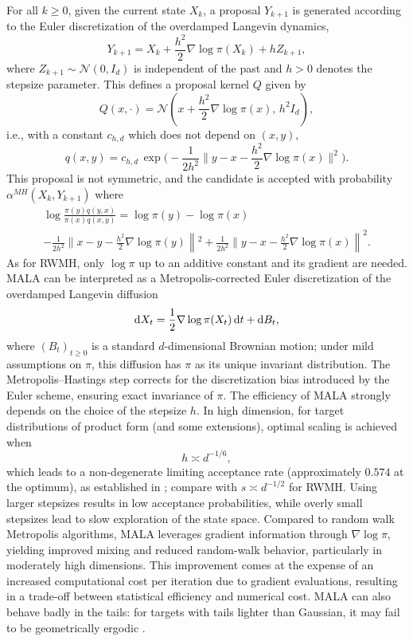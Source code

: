 \documentclass[english,graybox,envcountchap,envcountsame,sectrefs,shortlabels]{svmono}
\theoremstyle{style}
\newcommand{\eqsp}{}
\begin{document}
For all $k\geq 0$, given the current state $X_k$, a proposal $Y_{k+1}$ is generated according to the Euler discretization of the overdamped Langevin dynamics,
\[
Y_{k+1} = X_k + \frac{h^2}{2} \nabla \log \pi(X_k) + h Z_{k+1}\eqsp,
\]
where $Z_{k+1} \sim \mathcal{N}(0, I_d)$ is independent of the past and $h > 0$ denotes the stepsize parameter. This defines a proposal kernel $Q$ given by
\[
Q(x,\cdot) = \mathcal{N}\!\left(x + \frac{h^2}{2} \nabla \log \pi(x), \, h^2 I_d \right)\eqsp,
\]
i.e., with a constant $c_{h,d}$ which does not depend on $(x,y)$,
\[
q(x,y) = c_{h,d}\,\exp\Big(-\frac{1}{2h^2}\Big\|y-x-\frac{h^2}{2}\nabla\log\pi(x)\Big\|^2\Big)\eqsp.
\]
This proposal is not symmetric, and the candidate is accepted with probability $\alpha^{MH}(X_k,Y_{k+1})$ where
\begin{multline*}
\log\frac{\pi(y)q(y,x)}{\pi(x)q(x,y)} = \log\pi(y)-\log\pi(x) \\- \frac{1}{2h^2}\Big\|x-y-\frac{h^2}{2}\nabla\log\pi(y)\left\|^2+\frac{1}{2h^2}\Big\|y-x-\frac{h^2}{2}\nabla\log\pi(x)\right\|^2\eqsp.
\end{multline*}
As for RWMH, only $\log\pi$ up to an additive constant and its gradient are needed. MALA can be interpreted as a Metropolis-corrected Euler discretization of the overdamped Langevin diffusion
\[
\rmd X_t = \frac{1}{2} \nabla \log \pi(X_t)\,\rmd t + \rmd B_t\eqsp,
\]
where $(B_t)_{t\geq0}$ is a standard $d$-dimensional Brownian motion; under mild assumptions on $\pi$, this diffusion has $\pi$ as its unique invariant distribution.
The Metropolis--Hastings step corrects for the discretization bias introduced by the Euler scheme, ensuring exact invariance of $\pi$. The efficiency of MALA strongly depends on the choice of the stepsize $h$.
In high dimension, for target distributions of product form (and some extensions), optimal scaling is achieved when
\[
h\asymp d^{-1/6}\eqsp,
\]
which leads to a non-degenerate limiting acceptance rate (approximately $0.574$ at the optimum), as established in \cite{roberts1998optimal}; compare with $s\asymp d^{-1/2}$ for RWMH.
Using larger stepsizes results in low acceptance probabilities, while overly small stepsizes lead to slow exploration of the state space. Compared to random walk Metropolis algorithms, MALA leverages gradient information through $\nabla \log \pi$, yielding improved mixing and reduced random-walk behavior, particularly in moderately high dimensions.
This improvement comes at the expense of an increased computational cost per iteration due to gradient evaluations, resulting in a trade-off between statistical efficiency and numerical cost. MALA can also behave badly in the tails: for targets with tails lighter than Gaussian, it may fail to be geometrically ergodic \cite{roberts1996exponential}.
\end{document}
